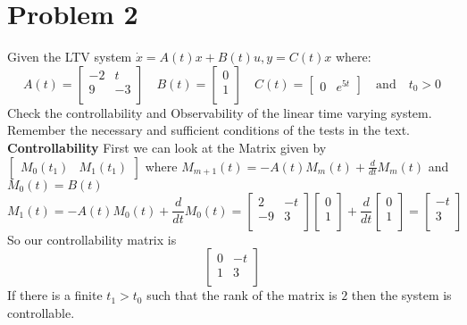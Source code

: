 \documentclass{article}
\begin{document}
\newpage
\section*{Problem 2}
Given the LTV system $\dot{x} = A(t)x + B(t)u, y = C(t)x$ where:
$$
A(t) =
\begin{bmatrix}
-2 &  t \\
 9 & -3 \\
\end{bmatrix}
\quad
B(t) =
\begin{bmatrix}
0 \\
1 \\
\end{bmatrix}
\quad
C(t) =
\begin{bmatrix} 0 & e^{5t} \end{bmatrix}
\quad
\text{and}
\quad
t_0 > 0
$$
Check the controllability and Observability of the linear time varying system.
Remember the necessary and sufficient conditions of the tests in the text.
\newline
\textbf{Controllability}
\newline
First we can look at the Matrix given by
$\begin{bmatrix} M_0(t_1) & M_1(t_1) \end{bmatrix}$ where $M_{m+1}(t) = -A(t)M_m(t) + \frac{d}{dt}M_m(t)$ and $M_0(t) = B(t)$
$$ M_1(t) = -A(t)M_0(t) + \frac{d}{dt} M_0(t) =
\begin{bmatrix}
2 & -t \\
-9 & 3 \\
\end{bmatrix}
\begin{bmatrix}
0 \\
1 \\
\end{bmatrix}
+
\frac{d}{dt}
\begin{bmatrix}
0 \\
1 \\
\end{bmatrix}
=
\begin{bmatrix}
-t \\
3 \\
\end{bmatrix}
$$
So our controllability matrix is
$$
\begin{bmatrix}
0 & -t \\
1 & 3 \\
\end{bmatrix}
$$
If there is a finite $t_1 > t_0$ such that the rank of the matrix is $2$ then the system is controllable.
\end{document}
